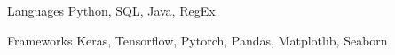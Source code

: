 
\begin{cvskills}
  \cvskill
    {Languages} %
    {Python, SQL, Java, RegEx} %

  \cvskill
    {Frameworks} %
    {Keras, Tensorflow, Pytorch, Pandas, Matplotlib, Seaborn} %
\end{cvskills}
